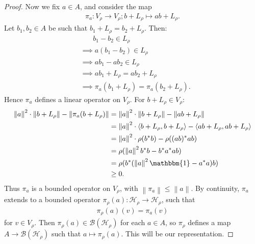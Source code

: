 \documentclass[11pt,a4paper]{report}
\theoremstyle{plain}
\theoremstyle{definition}
\newcommand{\1}{\mathbbm{1}}
\newcommand{\B}{\mathcal{B}}
\newcommand{\Hr}{\mathcal{H}_\rho}
\newcommand{\Vr}{V_\rho}
\begin{document}
\begin{proof}
	Now we fix $a \in A$, and consider the map 
	\begin{align*}
		\pi_a : V_\rho \to V_\rho; b+L_\rho \mapsto ab+L_\rho.
	\end{align*}
	Let $b_1, b_2 \in A$ be such that $b_1+L_\rho = b_2+L_\rho$. Then:
	\begin{align*}
		&~~~~~~~~	b_1-b_2 \in L_\rho										\\	
		&\implies	a(b_1-b_2) \in L_\rho									\\	
		&\implies	ab_1-ab_2 \in L_\rho									\\	
		&\implies	ab_1 + L_\rho = ab_2+L_\rho								\\	
		&\implies	\pi_a(b_1+L_\rho) = \pi_a(b_2+L_\rho).
	\end{align*}
	Hence $\pi_a$ defines a linear operator on $V_\rho$.
	For $b+L_\rho \in V_\rho$:
	\begin{align*}
				\left\|a\right\|^2 \cdot \left\|b+L_\rho\right\| 
									- \left\| \pi_a(b+L_\rho) \right\|
		&=		\left\|a\right\|^2 \cdot \left\|b+L_\rho\right\| 
									- \left\| ab+L_\rho \right\|						\\
		&=		\left\|a\right\|^2 \cdot \langle b+L_\rho,b+L_\rho \rangle 
									- \langle ab+L_\rho,ab+L_\rho \rangle				\\
		&=		\left\|a\right\|^2 \cdot \rho(b^\ast b) - \rho ((ab)^\ast ab)			\\
		&= 		\rho (\left\|a\right\|^2 b^\ast b-b^\ast a^\ast ab)						\\
		&=		\rho (b^\ast (\left\|a\right\|^{2} \mathbbm{1} - a ^\ast a)b)			\\
		&\geq 	0.
	\end{align*}
	Thus $\pi_a$ is a bounded operator on $\Vr$, with $\left\|\pi_a\right\| \leq \left\|a\right\|$. By continuity, $\pi_a$ extends to a bounded operator $\pi_\rho(a):\Hr \to \Hr$,
	such that 
	\begin{align*} 
		\pi_\rho(a)(v) = \pi_a(v) 
	\end{align*} 
	for $v\in \Vr$. 
	Then $\pi_\rho(a) \in \B(\Hr)$ for each $a \in A$, so $\pi_\rho$ defines a map 
	$A \to \B(\Hr)$ such that $ a \mapsto \pi_\rho(a)$. This will be our representation.
	

\end{proof}
\end{document}
